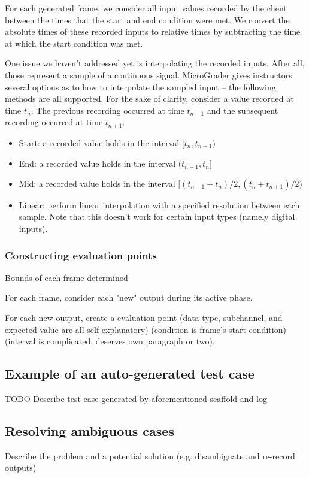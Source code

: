 \documentclass[12pt]{article}
\begin{document}
For each generated frame, we consider all input values recorded by the client between the times that the start and end condition were met.  We convert the absolute times of these recorded inputs to relative times by subtracting the time at which the start condition was met.

One issue we haven't addressed yet is interpolating the recorded inputs.  After all, those represent a sample of a continuous signal.  MicroGrader gives instructors several options as to how to interpolate the sampled input -- the following methods are all supported.  For the sake of clarity, consider a value recorded at time $t_n$.  The previous recording occurred at time $t_{n-1}$ and the subsequent recording occurred at time $t_{n+1}$.

\begin{itemize}
\item Start: a recorded value holds in the interval $[t_n, t_{n+1})$
\item End: a recorded value holds in the interval $(t_{n-1}, t_n]$
\item Mid: a recorded value holds in the interval $[(t_{n-1} + t_n)/2, (t_n + t_{n+1})/2)$
\item Linear: perform linear interpolation with a specified resolution between each sample.  Note that this doesn't work for certain input types (namely digital inputs).
\end{itemize}

\subsubsection{Constructing evaluation points}
\label{sec:using-point-templates}
Bounds of each frame determined

For each frame, consider each "new" output during its active phase.

For each new output, create a evaluation point (data type, subchannel, and expected value are all self-explanatory) (condition is frame's start condition) (interval is complicated, deserves own paragraph or two).

\subsection{Example of an auto-generated test case}
TODO Describe test case generated by aforementioned scaffold and log

\subsection{Resolving ambiguous cases}
Describe the problem and a potential solution (e.g. disambiguate and re-record outputs)
\end{document}
